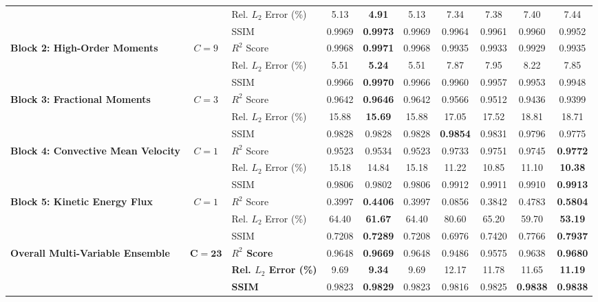 \documentclass{article}
\begin{document}
\begin{landscape}
\begin{table}[p]
{\begin{tabular}{l c l ccc cccc}
 & & Rel. $L_2$ Error (\%) & 5.13 & \textbf{4.91} & 5.13 & 7.34 & 7.38 & 7.40 & 7.44 \\
 & & SSIM & 0.9969 & \textbf{0.9973} & 0.9969 & 0.9964 & 0.9961 & 0.9960 & 0.9952 \\
\midrule
\multirow{3}{*}{\textbf{Block 2: High-Order Moments}} 
 & \multirow{3}{*}{$C=9$} 
 & $R^2$ Score & 0.9968 & \textbf{0.9971} & 0.9968 & 0.9935 & 0.9933 & 0.9929 & 0.9935 \\
 & & Rel. $L_2$ Error (\%) & 5.51 & \textbf{5.24} & 5.51 & 7.87 & 7.95 & 8.22 & 7.85 \\
 & & SSIM & 0.9966 & \textbf{0.9970} & 0.9966 & 0.9960 & 0.9957 & 0.9953 & 0.9948 \\
\midrule
\multirow{3}{*}{\textbf{Block 3: Fractional Moments}} 
 & \multirow{3}{*}{$C=3$} 
 & $R^2$ Score & 0.9642 & \textbf{0.9646} & 0.9642 & 0.9566 & 0.9512 & 0.9436 & 0.9399 \\
 & & Rel. $L_2$ Error (\%) & 15.88 & \textbf{15.69} & 15.88 & 17.05 & 17.52 & 18.81 & 18.71 \\
 & & SSIM & 0.9828 & 0.9828 & 0.9828 & \textbf{0.9854} & 0.9831 & 0.9796 & 0.9775 \\
\midrule
\multirow{3}{*}{\textbf{Block 4: Convective Mean Velocity}} 
 & \multirow{3}{*}{$C=1$} 
 & $R^2$ Score & 0.9523 & 0.9534 & 0.9523 & 0.9733 & 0.9751 & 0.9745 & \textbf{0.9772} \\
 & & Rel. $L_2$ Error (\%) & 15.18 & 14.84 & 15.18 & 11.22 & 10.85 & 11.10 & \textbf{10.38} \\
 & & SSIM & 0.9806 & 0.9802 & 0.9806 & 0.9912 & 0.9911 & 0.9910 & \textbf{0.9913} \\
\midrule
\multirow{3}{*}{\textbf{Block 5: Kinetic Energy Flux}} 
 & \multirow{3}{*}{$C=1$} 
 & $R^2$ Score & 0.3997 & \textbf{0.4406} & 0.3997 & 0.0856 & 0.3842 & 0.4783 & \textbf{0.5804} \\
 & & Rel. $L_2$ Error (\%) & 64.40 & \textbf{61.67} & 64.40 & 80.60 & 65.20 & 59.70 & \textbf{53.19} \\
 & & SSIM & 0.7208 & \textbf{0.7289} & 0.7208 & 0.6976 & 0.7420 & 0.7766 & \textbf{0.7937} \\
\midrule
\multirow{3}{*}{\textbf{Overall Multi-Variable Ensemble}} 
 & \multirow{3}{*}{$\bm{C=23}$} 
 & \textbf{$R^2$ Score} & 0.9648 & \textbf{0.9669} & 0.9648 & 0.9486 & 0.9575 & 0.9638 & \textbf{0.9680} \\
 & & \textbf{Rel. $L_2$ Error (\%)} & 9.69 & \textbf{9.34} & 9.69 & 12.17 & 11.78 & 11.65 & \textbf{11.19} \\
 & & \textbf{SSIM} & 0.9823 & \textbf{0.9829} & 0.9823 & 0.9816 & 0.9825 & \textbf{0.9838} & \textbf{0.9838} \\
\bottomrule
\end{tabular}%
}
\end{table}
\end{landscape}
\end{document}
